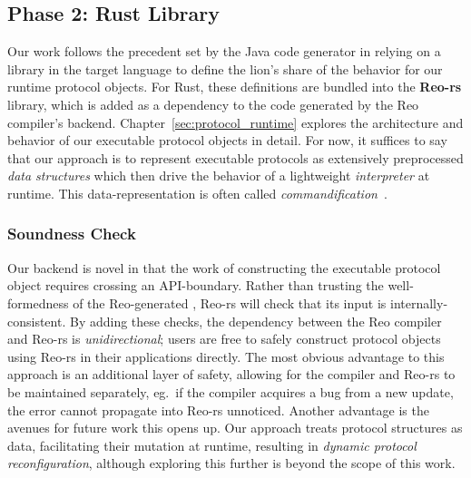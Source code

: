\subsection{Phase 2: Rust Library}
\label{sec:translation_phase_2}



Our work follows the precedent set by the Java code generator in relying on a library in the target language to define the lion's share of the behavior for our runtime protocol objects. For Rust, these definitions are bundled into the \textbf{Reo-rs} library, which is added as a dependency to the code generated by the Reo compiler's backend. Chapter~\ref{sec:protocol_runtime} explores the architecture and behavior of our executable protocol objects in detail. For now, it suffices to say that our approach is to represent executable protocols as extensively preprocessed \textit{data structures} which then drive the behavior of a lightweight \textit{interpreter} at runtime. This data-representation is often called \textit{commandification}~\cite{nystrom2014game}.

\subsubsection{Soundness Check}
Our backend is novel in that the work of constructing the executable protocol object requires crossing an API-boundary. Rather than trusting the well-formedness of the Reo-generated , Reo-rs will check that its input is internally-consistent. By adding these checks, the dependency between the Reo compiler and Reo-rs is \textit{unidirectional}; users are free to safely construct protocol objects using Reo-rs in their applications directly. The most obvious advantage to this approach is an additional layer of safety, allowing for the compiler and Reo-rs to be maintained separately, eg.\ if the compiler acquires a bug from a new update, the error cannot propagate into Reo-rs unnoticed. Another advantage is the avenues for future work this opens up. Our approach treats protocol structures as data, facilitating their mutation at runtime, resulting in \textit{dynamic protocol reconfiguration}, although exploring this further is beyond the scope of this work.

